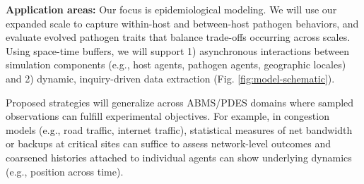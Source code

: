 








% 
\vspace{.5em}

\noindent\textbf{Application areas:} Our focus is epidemiological modeling.
We will use our expanded scale to capture within-host and between-host pathogen behaviors, and evaluate evolved pathogen traits that balance trade-offs occurring across scales.
Using space-time buffers, we will support 1) asynchronous interactions between simulation components (e.g., host agents, pathogen agents, geographic locales) and 2) dynamic, inquiry-driven data extraction (Fig. \ref{fig:model-schematic}).

Proposed strategies will generalize across ABMS/PDES domains where sampled observations can fulfill experimental objectives.
For example, in congestion models (e.g., road traffic, internet traffic), statistical measures of net bandwidth or backups at critical sites can suffice to assess network-level outcomes and coarsened histories attached to individual agents can show underlying dynamics (e.g., position across time).
%
